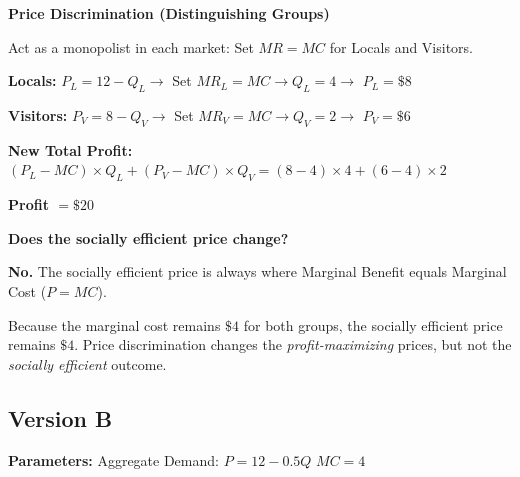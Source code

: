 \documentclass[12pt]{article}
\begin{document}
\begin{subqs}
\item \textbf{Price Discrimination (Distinguishing Groups)}
  \begin{solbullets}
    \item Act as a monopolist in each market: Set $MR = MC$ for Locals and Visitors.
    \item \textbf{Locals:} $P_L = 12 - Q_L \rightarrow$ Set $MR_L = MC \rightarrow Q_L = 4 \rightarrow$ \textbf{$P_L = \$8$}
    \item \textbf{Visitors:} $P_V = 8 - Q_V \rightarrow$ Set $MR_V = MC \rightarrow Q_V = 2 \rightarrow$ \textbf{$P_V = \$6$}
    \item \textbf{New Total Profit:} $(P_L - MC) \times Q_L + (P_V - MC) \times Q_V = (8 - 4) \times 4 + (6 - 4) \times 2$
    \item \textbf{Profit $= \$20$}
  \end{solbullets}

\item \textbf{Does the socially efficient price change?}
  \begin{solbullets}
    \item \textbf{No.} The socially efficient price is always where Marginal Benefit equals Marginal Cost ($P = MC$).
    \item Because the marginal cost remains $\$4$ for both groups, the socially efficient price remains $\$4$. Price discrimination changes the \textit{profit-maximizing} prices, but not the \textit{socially efficient} outcome.
  \end{solbullets}

\end{subqs}

\newpage

\subsection*{Version B}

\textbf{Parameters:} Aggregate Demand: $P = 12 - 0.5Q$ \textbar{} $MC = 4$
\end{document}
